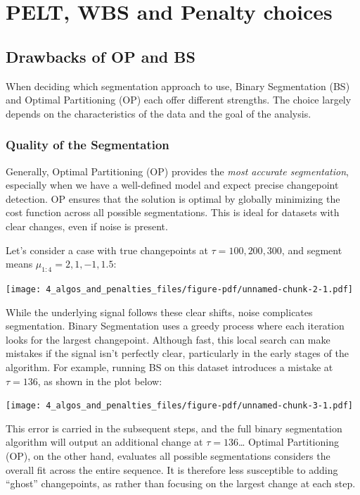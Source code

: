 \documentclass[
  letterpaper,
  DIV=11,
  numbers=noendperiod]{scrreprt}
\begin{document}

\chapter{PELT, WBS and Penalty
choices}\label{pelt-wbs-and-penalty-choices}

\section{Drawbacks of OP and BS}\label{drawbacks-of-op-and-bs}

When deciding which segmentation approach to use, Binary Segmentation
(BS) and Optimal Partitioning (OP) each offer different strengths. The
choice largely depends on the characteristics of the data and the goal
of the analysis.

\subsection{Quality of the
Segmentation}\label{quality-of-the-segmentation}

Generally, Optimal Partitioning (OP) provides the \emph{most accurate
segmentation}, especially when we have a well-defined model and expect
precise changepoint detection. OP ensures that the solution is optimal
by globally minimizing the cost function across all possible
segmentations. This is ideal for datasets with clear changes, even if
noise is present.

Let's consider a case with true changepoints at
\(\tau = 100, 200, 300\), and segment means
\(\mu_{1:4} = 2, 1, -1, 1.5\):

\texttt{[image: 4\_algos\_and\_penalties\_files/figure-pdf/unnamed-chunk-2-1.pdf]}

While the underlying signal follows these clear shifts, noise
complicates segmentation. Binary Segmentation uses a greedy process
where each iteration looks for the largest changepoint. Although fast,
this local search can make mistakes if the signal isn't perfectly clear,
particularly in the early stages of the algorithm. For example, running
BS on this dataset introduces a mistake at \(\tau = 136\), as shown in
the plot below:

\texttt{[image: 4\_algos\_and\_penalties\_files/figure-pdf/unnamed-chunk-3-1.pdf]}

This error is carried in the subsequent steps, and the full binary
segmentation algorithm will output an additional change at
\(\tau = 136\)\ldots{} Optimal Partitioning (OP), on the other hand,
evaluates all possible segmentations considers the overall fit across
the entire sequence. It is therefore less susceptible to adding
``ghost'' changepoints, as rather than focusing on the largest change at
each step.
\end{document}
